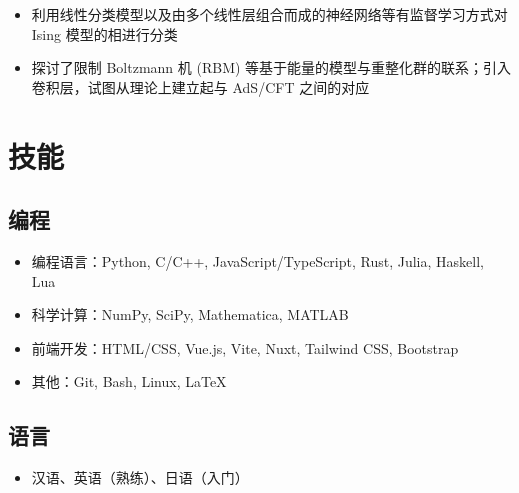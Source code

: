 \documentclass{resume-zh}
\begin{document}
\begin{itemize}
  \item 利用线性分类模型以及由多个线性层组合而成的神经网络等有监督学习方式对 Ising 模型的相进行分类
  \item 探讨了限制 Boltzmann 机 (RBM) 等基于能量的模型与重整化群的联系；引入卷积层，试图从理论上建立起与 AdS/CFT 之间的对应
\end{itemize}

\section{技能}

\subsection{编程}

\begin{itemize}
  \item 编程语言：Python, C/C++, JavaScript/TypeScript, Rust, Julia, Haskell, Lua
  \item 科学计算：NumPy, SciPy, Mathematica, MATLAB
  \item 前端开发：HTML/CSS, Vue.js, Vite, Nuxt, Tailwind CSS, Bootstrap
  \item 其他：Git, Bash, Linux, \LaTeX{}
\end{itemize}

\subsection{语言}

\begin{itemize}
  \item 汉语、英语（熟练）、日语（入门）
\end{itemize}

\lastupdated
\end{document}

